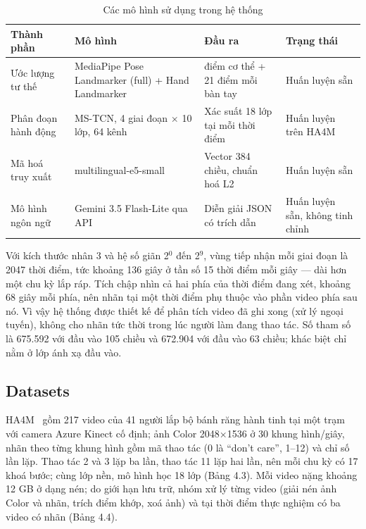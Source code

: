 \begin{table}[H]
\centering
\caption{Các mô hình sử dụng trong hệ thống}
\small
\setlength{\tabcolsep}{3pt}\renewcommand{\arraystretch}{1.15}
\begin{tabular}{@{}>{\raggedright\arraybackslash}p{}>{\centering\arraybackslash}p{}>{\centering\arraybackslash}p{}>{\centering\arraybackslash}p{}@{}}
\toprule
\textbf{Thành phần} & \textbf{Mô hình} & \textbf{Đầu ra} & \textbf{Trạng thái} \\\midrule
Ước lượng tư thế & MediaPipe Pose Landmarker (full) + Hand Landmarker & 33 điểm cơ thể + 21 điểm mỗi bàn tay & Huấn luyện sẵn \\
Phân đoạn hành động & MS-TCN, 4 giai đoạn $\times$ 10 lớp, 64 kênh & Xác suất 18 lớp tại mỗi thời điểm & Huấn luyện trên HA4M \\
Mã hoá truy xuất & multilingual-e5-small & Vector 384 chiều, chuẩn hoá L2 & Huấn luyện sẵn \\
Mô hình ngôn ngữ & Gemini 3.5 Flash-Lite qua API & Diễn giải JSON có trích dẫn & Huấn luyện sẵn, không tinh chỉnh \\
\bottomrule
\end{tabular}
\end{table}

Với kích thước nhân 3 và hệ số giãn 2$^{0}$ đến 2$^{9}$, vùng tiếp nhận mỗi giai đoạn là 2047 thời điểm, tức khoảng 136 giây ở tần số 15 thời điểm mỗi giây — dài hơn một chu kỳ lắp ráp. Tích chập nhìn cả hai phía của thời điểm đang xét, khoảng 68 giây mỗi phía, nên nhãn tại một thời điểm phụ thuộc vào phần video phía sau nó. Vì vậy hệ thống được thiết kế để phân tích video đã ghi xong (xử lý ngoại tuyến), không cho nhãn tức thời trong lúc người làm đang thao tác. Số tham số là 675.592 với đầu vào 105 chiều và 672.904 với đầu vào 63 chiều; khác biệt chỉ nằm ở lớp ánh xạ đầu vào.

\subsection{Datasets}

HA4M~\citep{ha4m} gồm 217 video của 41 người lắp bộ bánh răng hành tinh tại một trạm với camera Azure Kinect cố định; ảnh Color 2048$\times$1536 ở 30 khung hình/giây, nhãn theo từng khung hình gồm mã thao tác (0 là “don't care”, 1–12) và chỉ số lần lặp. Thao tác 2 và 3 lặp ba lần, thao tác 11 lặp hai lần, nên mỗi chu kỳ có 17 khoá bước; cùng lớp nền, mô hình học 18 lớp (Bảng 4.3). Mỗi video nặng khoảng 12 GB ở dạng nén; do giới hạn lưu trữ, nhóm xử lý từng video (giải nén ảnh Color và nhãn, trích điểm khớp, xoá ảnh) và tại thời điểm thực nghiệm có ba video có nhãn (Bảng 4.4).

